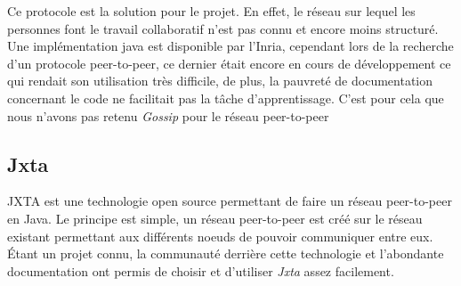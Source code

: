 		Ce protocole est la solution pour le projet. En effet, le réseau sur
		lequel les personnes font le travail collaboratif n'est pas connu et
		encore moins structuré. Une implémentation java est disponible par
		l'Inria, cependant lors de la recherche d'un protocole peer-to-peer, ce
		dernier était encore en cours de développement ce qui rendait son
		utilisation très difficile, de plus, la pauvreté de documentation
		concernant le code ne facilitait pas la tâche d'apprentissage. C'est
		pour cela que nous n'avons pas retenu \emph{Gossip} pour le réseau
		peer-to-peer
	
	\subsection{Jxta}
		JXTA est une technologie open source permettant de faire un réseau
		peer-to-peer en Java. Le principe est simple, un réseau peer-to-peer est
		créé sur le réseau existant permettant aux différents noeuds de pouvoir
		communiquer entre eux.\\
		
		Étant un projet connu, la communauté derrière cette technologie et
		l'abondante documentation ont permis de choisir et d'utiliser
		\emph{Jxta} assez facilement.